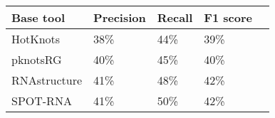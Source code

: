 \setlength\extrarowheight{4pt}
\begin{table}[h]
\begin{tabular}{|P{2.5cm}|P{2.5cm}|P{2.5cm}|P{2.5cm}|P{2.5cm}|}
\hline
Base tool         & Precision & Recall & F1 score \\ \hline \hline
HotKnots     & 38\%      & 44\%   & 39\%     \\ \hline
pknotsRG     & 40\%      & 45\%   & 40\%     \\ \hline
RNAstructure & 41\%      & 48\%   & 42\%     \\ \hline
SPOT-RNA     & 41\%      & 50\%   & 42\%     \\ \hline
\end{tabular}
\end{table}